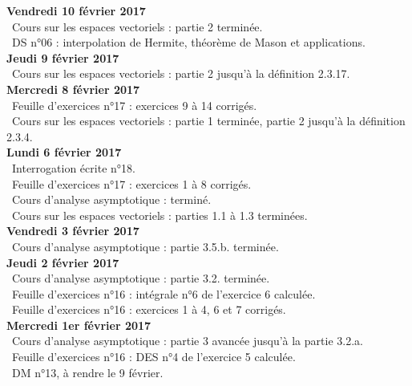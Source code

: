 \documentclass[12pt,a4paper]{article}
\begin{document}
\noindent\textbf{Vendredi 10 février 2017}\\
\bu\ Cours sur les espaces vectoriels : partie 2 terminée.\\
\bu\ DS n°06 : interpolation de Hermite, théorème de Mason et applications.\vspace{.4cm}\\

\noindent\textbf{Jeudi 9 février 2017}\\
\bu\ Cours sur les espaces vectoriels : partie 2 jusqu'à la définition 2.3.17.\vspace{.4cm}\\

\noindent\textbf{Mercredi 8 février 2017}\\
\bu\ Feuille d'exercices n°17 : exercices 9 à 14 corrigés.\\
\bu\ Cours sur les espaces vectoriels : partie 1 terminée, partie 2 jusqu'à la définition 2.3.4.\vspace{.4cm}\\

\noindent\textbf{Lundi 6 février 2017}\\
\bu\ Interrogation écrite n°18.\\
\bu\ Feuille d'exercices n°17 : exercices 1 à 8 corrigés.\\
\bu\ Cours d'analyse asymptotique : terminé.\\
\bu\ Cours sur les espaces vectoriels : parties 1.1 à 1.3 terminées.\vspace{.4cm}\\

\noindent\textbf{Vendredi 3 février 2017}\\
\bu\ Cours d'analyse asymptotique : partie 3.5.b. terminée.\vspace{.4cm}\\

\noindent\textbf{Jeudi 2 février 2017}\\
\bu\ Cours d'analyse asymptotique : partie 3.2. terminée.\\
\bu\ Feuille d'exercices n°16 : intégrale n°6 de l'exercice 6 calculée.\\
\bu\ Feuille d'exercices n°16 : exercices 1 à 4, 6 et 7 corrigés.\vspace{.4cm}\\

\noindent\textbf{Mercredi 1er février 2017}\\
\bu\ Cours d'analyse asymptotique : partie 3 avancée jusqu'à la partie 3.2.a.\\
\bu\ Feuille d'exercices n°16 : DES n°4 de l'exercice 5 calculée.\\
\bu\ DM n°13, à rendre le 9 février.\vspace{.4cm}\\
\end{document}
